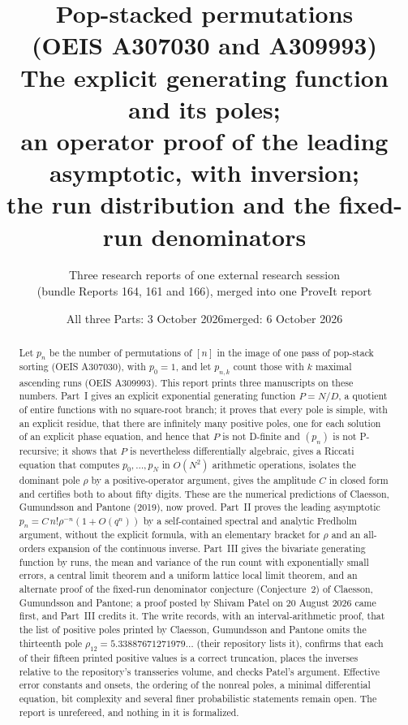 \documentclass[11pt,letterpaper]{article}
\title{\textbf{Pop-stacked permutations\\ (OEIS A307030 and A309993)}\\[7pt]
\large The explicit generating function and its poles;\\ an operator proof of the leading asymptotic, with inversion;\\ the run distribution and the fixed-run denominators}
\author{Three research reports of one external research session\\(bundle Reports 164, 161 and 166), merged into one ProveIt report}
\date{All three Parts: 3 October 2026\quad merged: 6 October 2026}
\numberwithin{equation}{section}
\theoremstyle{remark}\newtheorem{remark}[theorem]{Remark}
\begin{document}
\hypersetup{pageanchor=false}
\maketitle
\begin{abstract}
Let $p_n$ be the number of permutations of $[n]$ in the image of one pass of pop-stack sorting (OEIS A307030), with $p_0=1$, and let $p_{n,k}$ count those with $k$ maximal ascending runs (OEIS A309993). This report prints three manuscripts on these numbers. Part~I gives an explicit exponential generating function $P=N/D$, a quotient of entire functions with no square-root branch; it proves that every pole is simple, with an explicit residue, that there are infinitely many positive poles, one for each solution of an explicit phase equation, and hence that $P$ is not D-finite and $(p_n)$ is not P-recursive; it shows that $P$ is nevertheless differentially algebraic, gives a Riccati equation that computes $p_0,\dots,p_N$ in $O(N^2)$ arithmetic operations, isolates the dominant pole $\rho$ by a positive-operator argument, gives the amplitude $C$ in closed form and certifies both to about fifty digits. These are the numerical predictions of Claesson, Gu\dh mundsson and Pantone (2019), now proved. Part~II proves the leading asymptotic $p_n=C\,n!\rho^{-n}(1+O(q^n))$ by a self-contained spectral and analytic Fredholm argument, without the explicit formula, with an elementary bracket for $\rho$ and an all-orders expansion of the continuous inverse. Part~III gives the bivariate generating function by runs, the mean and variance of the run count with exponentially small errors, a central limit theorem and a uniform lattice local limit theorem, and an alternate proof of the fixed-run denominator conjecture (Conjecture~2) of Claesson, Gu\dh mundsson and Pantone; a proof posted by Shivam Patel on 20 August 2026 came first, and Part~III credits it. The write records, with an interval-arithmetic proof, that the list of positive poles printed by Claesson, Gu\dh mundsson and Pantone omits the thirteenth pole $\rho_{12}=5.33887671271979\ldots$ (their repository lists it), confirms that each of their fifteen printed positive values is a correct truncation, places the inverses relative to the repository's transseries volume, and checks Patel's argument. Effective error constants and onsets, the ordering of the nonreal poles, a minimal differential equation, bit complexity and several finer probabilistic statements remain open. The report is unrefereed, and nothing in it is formalized.
\end{abstract}
\hypersetup{pageanchor=true}
{\small\setlength{\parskip}{0pt}\tableofcontents}
\newpage
\end{document}
